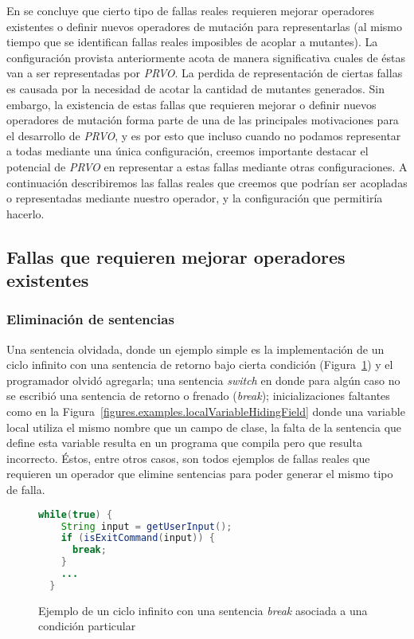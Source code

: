 En \cite{bibliography.mutation.evaluation.valid-substitute} se concluye que cierto tipo de fallas reales requieren mejorar operadores existentes o definir nuevos operadores de mutaci\'on para representarlas (al mismo tiempo que se identifican fallas reales imposibles de acoplar a mutantes). La configuraci\'on provista anteriormente acota de manera significativa cuales de \'estas van a ser representadas por \emph{PRVO}. La perdida de representaci\'on de ciertas fallas es causada por la necesidad de acotar la cantidad de mutantes generados. Sin embargo, la existencia de estas fallas que requieren mejorar o definir nuevos operadores de mutaci\'on forma parte de una de las principales motivaciones para el desarrollo de \emph{PRVO}, y es por esto que incluso cuando no podamos representar a todas mediante una \'unica configuraci\'on, creemos importante destacar el potencial de \emph{PRVO} en representar a estas fallas mediante otras configuraciones. A continuaci\'on describiremos las fallas reales que creemos que podr\'ian ser acopladas o representadas mediante nuestro operador, y la configuraci\'on que permitir\'ia hacerlo.

\subsection{Fallas que requieren mejorar operadores existentes}

\subsubsection{Eliminaci\'on de sentencias}

Una sentencia olvidada, donde un ejemplo simple es la implementaci\'on de un ciclo infinito con una sentencia de retorno bajo cierta condici\'on (Figura~\ref{figures.examples.infCicle}) y el programador olvid\'o agregarla; una sentencia \emph{switch} en donde para alg\'un caso no se escribi\'o una sentencia de retorno o frenado (\emph{break}); inicializaciones faltantes como en la Figura~\ref{figures.examples.localVariableHidingField} donde una variable local utiliza el mismo nombre que un campo de clase, la falta de la sentencia que define esta variable resulta en un programa que compila pero que resulta incorrecto. \'Estos, entre otros casos, son todos ejemplos de fallas reales que requieren un operador que elimine sentencias para poder generar el mismo tipo de falla.

\begin{figure}
	\centering
	\begin{lstlisting}[frame=single, mathescape=true,xleftmargin=0.012\textwidth,xrightmargin=0.012\textwidth,language=Java,basicstyle={}]
  while(true) {
    String input = getUserInput();
    if (isExitCommand(input)) {
      break;
    }
    ...
  }
	\end{lstlisting}
	\caption[Ejemplo de ciclo infinito conteniendo un \emph{break}]{Ejemplo de un ciclo infinito con una sentencia \emph{break} asociada a una condici\'on particular}
	\label{figures.examples.infCicle}
\end{figure}

